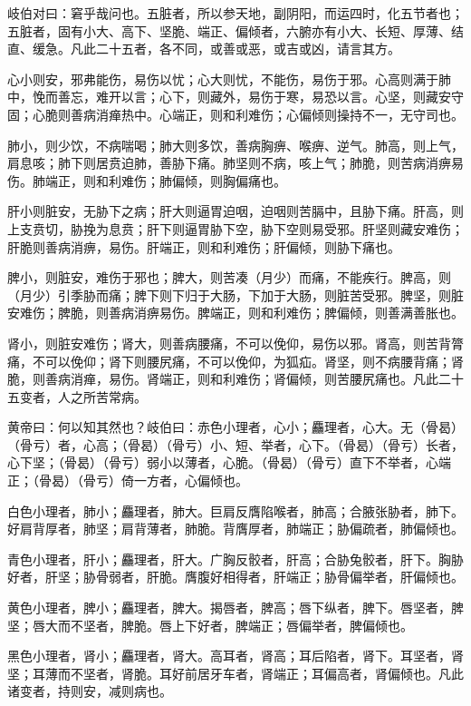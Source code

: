 \documentclass[a4paper,12pt,UTF8,twoside]{ctexbook}
\begin{document}
	岐伯对曰：窘乎哉问也。五脏者，所以参天地，副阴阳，而运四时，化五节者也；五脏者，固有小大、高下、坚脆、端正、偏倾者，六腑亦有小大、长短、厚薄、结直、缓急。凡此二十五者，各不同，或善或恶，或吉或凶，请言其方。
	
	心小则安，邪弗能伤，易伤以忧；心大则忧，不能伤，易伤于邪。心高则满于肺中，悗而善忘，难开以言；心下，则藏外，易伤于寒，易恐以言。心坚，则藏安守固；心脆则善病消瘅热中。心端正，则和利难伤；心偏倾则操持不一，无守司也。
	
	肺小，则少饮，不病喘喝；肺大则多饮，善病胸痹、喉痹、逆气。肺高，则上气，肩息咳；肺下则居贲迫肺，善胁下痛。肺坚则不病，咳上气；肺脆，则苦病消痹易伤。肺端正，则和利难伤；肺偏倾，则胸偏痛也。
	
	肝小则脏安，无胁下之病；肝大则逼胃迫咽，迫咽则苦膈中，且胁下痛。肝高，则上支贲切，胁挽为息贲；肝下则逼胃胁下空，胁下空则易受邪。肝坚则藏安难伤；肝脆则善病消痹，易伤。肝端正，则和利难伤；肝偏倾，则胁下痛也。
	
	脾小，则脏安，难伤于邪也；脾大，则苦凑（月少）而痛，不能疾行。脾高，则（月少）引季胁而痛；脾下则下归于大肠，下加于大肠，则脏苦受邪。脾坚，则脏安难伤；脾脆，则善病消痹易伤。脾端正，则和利难伤；脾偏倾，则善满善胀也。
	
	肾小，则脏安难伤；肾大，则善病腰痛，不可以俛仰，易伤以邪。肾高，则苦背膂痛，不可以俛仰；肾下则腰尻痛，不可以俛仰，为狐疝。肾坚，则不病腰背痛；肾脆，则善病消瘅，易伤。肾端正，则和利难伤；肾偏倾，则苦腰尻痛也。凡此二十五变者，人之所苦常病。
	
	黄帝曰：何以知其然也？岐伯曰：赤色小理者，心小；麤理者，心大。无（骨曷）（骨亏）者，心高；（骨曷）（骨亏）小、短、举者，心下。（骨曷）（骨亏）长者，心下坚；（骨曷）（骨亏）弱小以薄者，心脆。（骨曷）（骨亏）直下不举者，心端正；（骨曷）（骨亏）倚一方者，心偏倾也。
	
	白色小理者，肺小；麤理者，肺大。巨肩反膺陷喉者，肺高；合腋张胁者，肺下。好肩背厚者，肺坚；肩背薄者，肺脆。背膺厚者，肺端正；胁偏疏者，肺偏倾也。
	
	青色小理者，肝小；麤理者，肝大。广胸反骹者，肝高；合胁兔骹者，肝下。胸胁好者，肝坚；胁骨弱者，肝脆。膺腹好相得者，肝端正；胁骨偏举者，肝偏倾也。
	
	黄色小理者，脾小；麤理者，脾大。揭唇者，脾高；唇下纵者，脾下。唇坚者，脾坚；唇大而不坚者，脾脆。唇上下好者，脾端正；唇偏举者，脾偏倾也。
	
	黑色小理者，肾小；麤理者，肾大。高耳者，肾高；耳后陷者，肾下。耳坚者，肾坚；耳薄而不坚者，肾脆。耳好前居牙车者，肾端正；耳偏高者，肾偏倾也。凡此诸变者，持则安，减则病也。
	
\end{document}
